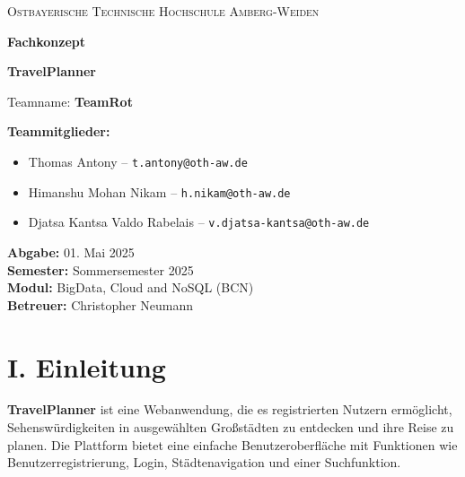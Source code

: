 \documentclass[a4paper,12pt]{article}
\begin{document}
    \begin{titlepage}
        \centering

        {\scshape\LARGE Ostbayerische Technische Hochschule Amberg-Weiden \par}
        \vspace{1.5cm}

        {\huge\bfseries Fachkonzept\par}
        \vspace{0.5cm}
        {\Huge\bfseries TravelPlanner\par}

        \vspace{2cm}
        {\Large Teamname: \textbf{TeamRot}\par}
        \vspace{0.5cm}

        \begin{flushleft}
            \textbf{Teammitglieder:}
            \begin{itemize}
                \item Thomas Antony – \texttt{t.antony@oth-aw.de}
                \item Himanshu Mohan Nikam – \texttt{h.nikam@oth-aw.de}
                \item Djatsa Kantsa Valdo Rabelais – \texttt{v.djatsa-kantsa@oth-aw.de}
            \end{itemize}

            \vspace{0.5cm}
            \textbf{Abgabe:} 01. Mai 2025 \\
            \textbf{Semester:} Sommersemester 2025 \\
            \textbf{Modul:} BigData, Cloud and NoSQL (BCN) \\
            \textbf{Betreuer:} Christopher Neumann

        \end{flushleft}

        \vfill
    \end{titlepage}


    \section*{I. Einleitung}
    \textbf{TravelPlanner} ist eine Webanwendung, die es registrierten Nutzern ermöglicht, Sehenswürdigkeiten in ausgewählten Großstädten zu entdecken und ihre Reise zu planen.
    Die Plattform bietet eine einfache Benutzeroberfläche mit Funktionen wie Benutzerregistrierung, Login, Städtenavigation und einer Suchfunktion.
\end{document}
